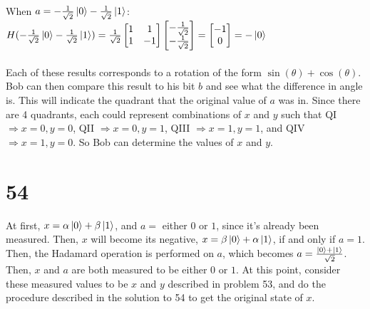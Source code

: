 \documentclass[letterpaper,notitlepage,twoside]{article}
\renewcommand{\implies}{\Rightarrow} %
\begin{document}
\\
When $a = -\frac{1}{\sqrt 2} \ket{0} - \frac{1}{\sqrt 2} \ket{1}$:\\
$H(-\frac{1}{\sqrt 2} \ket{0} - \frac{1}{\sqrt 2} \ket{1}) = \frac{1}{\sqrt 2} \begin{bmatrix}1 & 1 \\ 1 & -1 \end{bmatrix} \begin{bmatrix}-\frac{1}{\sqrt 2} \\ -\frac{1}{\sqrt 2} \end{bmatrix} = \begin{bmatrix} -1 \\ 0 \end{bmatrix} = -\ket{0}$\\ 
\\
Each of these results corresponds to a rotation of the form $\sin(\theta) + \cos(\theta)$. Bob can then compare this result to his bit $b$ and see what the difference in angle is. This will indicate the quadrant that the original value of $a$ was in. Since there are 4 quadrants, each could represent combinations of $x$ and $y$ such that QI $\implies x = 0, y = 0$, QII $\implies x = 0, y = 1$, QIII $\implies x = 1, y = 1$, and QIV $\implies x = 1, y = 0$. So Bob can determine the values of $x$ and $y$.

\section*{54}

At first, $x = \alpha \ket 0 + \beta \ket 1$, and $a = $ either $0$ or $1$, since it's already been measured. Then, $x$ will become its negative, $x = \beta \ket 0 + \alpha \ket 1$, if and only if $a = 1$. Then, the Hadamard operation is performed on $a$, which becomes $a = \frac{\ket 0 + \ket 1}{\sqrt 2}$. Then, $x$ and $a$ are both measured to be either $0$ or $1$. At this point, consider these measured values to be $x$ and $y$ described in problem 53, and do the procedure described in the solution to 54 to get the original state of $x$.
\end{document}
